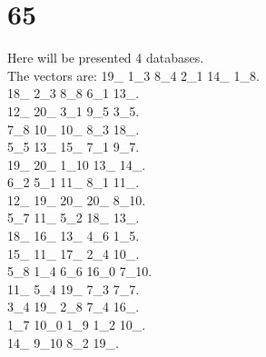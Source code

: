 \chapter{65}
\indent Here will be presented 4 databases.\\
The vectors are:
19\_ 1\_3 8\_4 2\_1 14\_ 1\_8.\\18\_ 2\_3 8\_8 6\_1 13\_.\\12\_ 20\_ 3\_1 9\_5 3\_5.\\7\_8 10\_ 10\_ 8\_3 18\_.\\5\_5 13\_ 15\_ 7\_1 9\_7.\\19\_ 20\_ 1\_10 13\_ 14\_.\\6\_2 5\_1 11\_ 8\_1 11\_.\\12\_ 19\_ 20\_ 20\_ 8\_10.\\5\_7 11\_ 5\_2 18\_ 13\_.\\18\_ 16\_ 13\_ 4\_6 1\_5.\\15\_ 11\_ 17\_ 2\_4 10\_.\\5\_8 1\_4 6\_6 16\_0 7\_10.\\11\_ 5\_4 19\_ 7\_3 7\_7.\\3\_4 19\_ 2\_8 7\_4 16\_.\\1\_7 10\_0 1\_9 1\_2 10\_.\\14\_ 9\_10 8\_2 19\_.\\